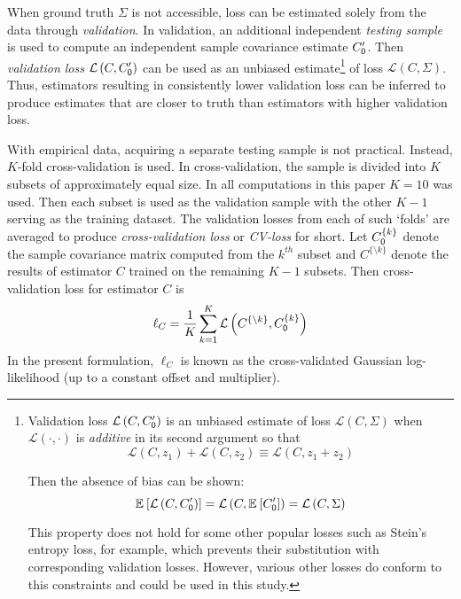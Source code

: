 \documentclass[10pt]{article}
\newcommand{\loss}[1]{\mathcal L\left(#1\right)}
\newcommand{\E}[2][]{\mathbb E_{#1}\left[ #2\right]}    %
\begin{document}
When ground truth $\Sigma$ is not accessible, loss can be estimated solely from the data through \emph{validation}.  In validation, an additional independent \emph{testing sample} is used to compute an independent sample covariance estimate $C_{\sf 0}^\prime$.  Then \emph{validation loss} $\loss{C,C_{\sf 0}^\prime}$ can be used as an unbiased estimate\footnote
{
    Validation loss $\loss{C,C_{\sf 0}^\prime}$ is an unbiased estimate of loss $\loss{C,\Sigma}$ when $\loss{\cdot,\cdot}$ is \emph{additive} in its second argument so that 
 \begin{equation*}\label{eq:additivity}
 \loss{C,z_1} + \loss{C,z_2} \equiv \loss{C,z_1+z_2}
 \end{equation*}

Then the absence of bias can be shown:
\begin{equation*}
    \E{\loss{C,C_{\sf 0}^\prime}}=\loss{C,\E{C_{\sf 0}^\prime}}=\loss{C,\Sigma}
\end{equation*}

This property does not hold for some other popular losses such as Stein's entropy loss, for example, which prevents their substitution with corresponding validation losses. However, various other losses do conform to this constraints and could be used in this study.
} 
of loss $\loss{C,\Sigma}$.  Thus, estimators resulting in consistently lower validation loss can be inferred to produce estimates that are closer to truth than estimators with higher validation loss. 

With empirical data, acquiring a separate testing sample is not practical. Instead, $K$-fold cross-validation is used.  In cross-validation, the sample is divided into $K$ subsets of approximately equal size. In all computations in this paper $K=10$ was used.  Then each  subset is used as the validation sample with the other $K-1$ serving as the training dataset. The validation losses from each of such `folds' are averaged to produce \emph{cross-validation loss} or \emph{CV-loss} for short.  Let $C_{\sf 0}^{\{k\}}$ denote the sample covariance matrix computed from the $k^{th}$ subset and $C^{\{\setminus k\}}$ denote the results of  estimator $C$ trained on the remaining $K-1$ subsets. Then cross-validation loss for estimator $C$ is
\begin{equation}\label{eq:cv-loss}
    \ell_C=\frac 1 K \sum\limits_{k=1}^K \loss{C^{\{\setminus k\}},C_{\sf 0}^{\{k\}}}
\end{equation}
In the present formulation, $\ell_C$ is known as the cross-validated Gaussian log-likelihood (up to a constant offset and multiplier).
\end{document}
